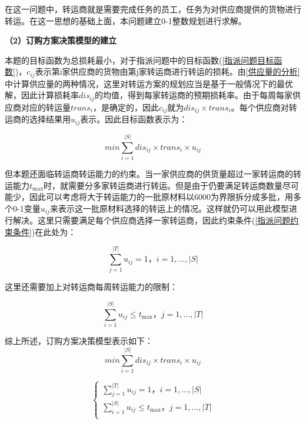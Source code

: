 \documentclass[withoutpreface,bwprint]{cumcmthesis} %
\begin{document}
在这一问题中，转运商就是需要完成任务的员工，任务为对供应商提供的货物进行转运。在这一思想的基础上面，本问题建立0-1整数规划进行求解。

\noindent\textbf{（2）订购方案决策模型的建立}

本题的目标函数为总损耗最小，对于指派问题中的目标函数(\ref{指派问题目标函数})，$c_{ij}$表示第i家供应商的货物由第j家转运商进行转运的损耗。由\ref{供应量的分析}中计算供应量的两种情况，这里对转运方案的规划应当是基于一般情况下的最优解，因此计算损耗率$dis_{ij}$的均值，得到每家转运商的预期损耗率。由于每周每家供应商对应的转运量$trans_i$，是确定的，因此$c_{ij}$就为$dis_{ij}\times trans_i$。每个供应商对转运商的选择结果用$u_{ij}$表示。因此目标函数表示为：

\begin{equation}
    min \sum_{i = 1}^{|S|}  dis_{ij}\times trans_i \times u_{ij}
\end{equation}

但本题还面临转运商转运能力的约束。当一家供应商的供货量超过一家转运商的转运能力$t_{\mathrm{max}}$时，就需要分多家转运商进行转运。但是由于仍要满足转运商数量尽可能少，因此可以考虑将大于转运能力的一批原材料以6000为界限拆分成多批，用多个0-1变量$u_{ij}$来表示这一批原材料选择的转运上的情况。这样就仍可以用此模型进行解决。这里只需要满足每个供应商选择一家转运商，因此约束条件(\ref{指派问题约束条件})在此处为：

\begin{equation}
    \sum_{j = 1}^{|T|} u_{ij}=1\text{，} i=1,...,|S|
\end{equation}

这里还需要加上对转运商每周转运能力的限制：

\begin{equation}
    \sum_{i = 1}^{|S|} u_{ij}\leq t_{\mathrm{max}}\text{，} j=1,...,|T|
\end{equation}

综上所述，订购方案决策模型表示如下：
\begin{equation}
    min \sum_{i = 1}^{|S|}  dis_{ij}\times trans_i \times u_{ij}
\end{equation}

\begin{equation}
    \begin{cases}
        \sum_{j = 1}^{|T|} u_{ij}=1\text{，} i=1,...,|S|\\
        \sum_{i = 1}^{|S|} u_{ij}\leq t_{\mathrm{max}}\text{，} j=1,...,|T|\\
    \end{cases}
\end{equation}
\end{document}
